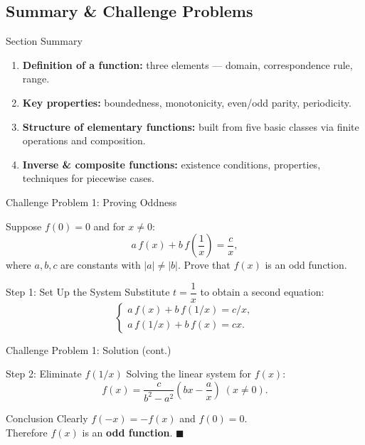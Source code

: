 \documentclass[aspectratio=169,10pt]{beamer}
\begin{document}
\subsection{Summary \& Challenge Problems}

\begin{frame}{Section Summary}
  \begin{enumerate}
    \item<1-> \textbf{Definition of a function:} three elements --- domain, correspondence rule, range.
    \item<2-> \textbf{Key properties:} boundedness, monotonicity, even/odd parity, periodicity.
    \item<3-> \textbf{Structure of elementary functions:} built from five basic classes via finite operations and composition.
    \item<4-> \textbf{Inverse \& composite functions:} existence conditions, properties, techniques for piecewise cases.
  \end{enumerate}
\end{frame}

\begin{frame}{Challenge Problem 1: Proving Oddness}
  \begin{example}
    Suppose $f(0)=0$ and for $x\neq 0$:
    \[
      a\,f(x)+b\,f\!\left(\frac{1}{x}\right)=\frac{c}{x},
    \]
    where $a,b,c$ are constants with $|a|\neq|b|$.
    Prove that $f(x)$ is an odd function.
  \end{example}
  \pause
  \begin{block}{Step 1: Set Up the System}
    Substitute $t=\dfrac{1}{x}$ to obtain a second equation:
    \[
      \begin{cases}
        a\,f(x)+b\,f(1/x)=c/x,\\[4pt]
        a\,f(1/x)+b\,f(x)=cx.
      \end{cases}
    \]
  \end{block}
\end{frame}

\begin{frame}{Challenge Problem 1: Solution (cont.)}
  \begin{block}{Step 2: Eliminate $f(1/x)$}
    Solving the linear system for $f(x)$:
    \[
      f(x)=\frac{c}{b^2-a^2}\!\left(bx-\frac{a}{x}\right)\;(x\neq0).
    \]
  \end{block}
  \pause
  \begin{alertblock}{Conclusion}
    Clearly $f(-x)=-f(x)$ and $f(0)=0$.\\
    Therefore $f(x)$ is an \textbf{odd function}. \hfill$\blacksquare$
  \end{alertblock}
\end{frame}
\end{document}
